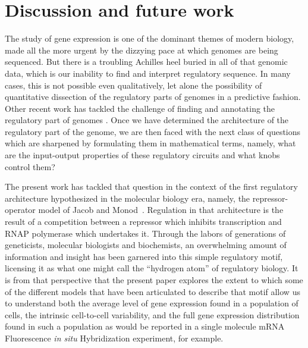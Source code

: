 \section{Discussion and future work}

The study of gene expression is one of the dominant themes of modern biology,
made all the more urgent by the dizzying pace at which genomes are being
sequenced. But there is a troubling Achilles heel buried in all of that genomic
data, which is our inability to find and interpret regulatory sequence. In
many cases, this is not possible even qualitatively, let alone the possibility
of quantitative dissection of the regulatory parts of genomes in a predictive
fashion. Other recent work has tackled the challenge of finding and annotating
the regulatory part of genomes \cite{Belliveau2018, Ireland2020}. Once we have
determined the architecture of the regulatory part of the genome, we are then
faced with the next class of questions which are sharpened by formulating them
in mathematical terms, namely, what are the input-output properties of these
regulatory circuits and what knobs control them?

The present work has tackled that question in the context of the first
regulatory architecture hypothesized in the molecular biology era, namely, the
repressor-operator model of Jacob and Monod~\cite{Jacob1961}. Regulation in that
architecture is the result of a competition between a repressor which inhibits
transcription and RNAP polymerase which undertakes it. Through the labors of
generations of geneticists, molecular biologists and biochemists, an
overwhelming amount of information and insight has been garnered into this
simple regulatory motif, licensing it as what one might call the ``hydrogen
atom'' of regulatory biology. It is from that perspective that the present paper
explores the extent to which some of the different models that have been
articulated to describe that motif allow us to understand both the average level
of gene expression found in a population of cells, the intrinsic cell-to-cell
variability, and the full gene expression distribution found in such a population
as would be reported in a single molecule mRNA Fluorescence \textit{in situ}
Hybridization experiment, for example.

